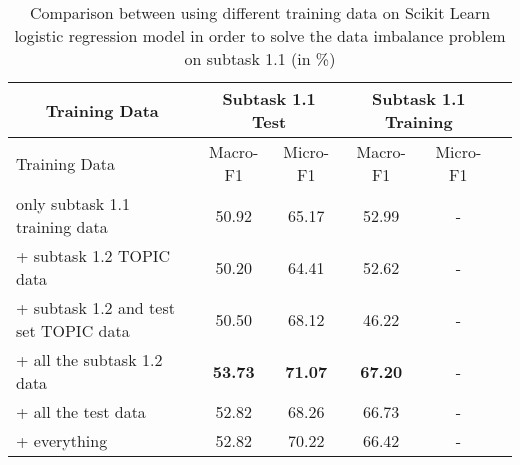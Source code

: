\begin{table}[htbp!] %
    \begin{tabular}{lccccc}
    \toprule
        \multicolumn{1}{c}{Training Data}            & \multicolumn{2}{c}{Subtask 1.1 Test}  & \multicolumn{2}{c}{Subtask 1.1 Training} \\
    \midrule
        Training Data                                & Macro-F1         & Micro-F1           & Macro-F1         & Micro-F1       \\
    \midrule
        only subtask 1.1 training data               & 50.92            & 65.17              & 52.99            & -              \\
        + subtask 1.2 TOPIC data                     & 50.20            & 64.41              & 52.62            & -              \\
        + subtask 1.2 and test set TOPIC data        & 50.50            & 68.12              & 46.22            & -              \\
        + all the subtask 1.2 data                   & \bf53.73         & \bf71.07           & \bf67.20         & -              \\
        + all the test data                          & 52.82            & 68.26              & 66.73            & -              \\
        + everything                                 & 52.82            & 70.22              & 66.42            & -              \\
    \bottomrule
    \end{tabular}
\caption{Comparison between using different training data on Scikit Learn logistic regression model in order to solve the data imbalance problem on subtask 1.1 (in \%)}
\label{tab:data_imbalance}
\end{table}
